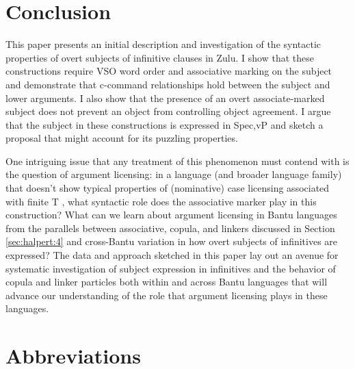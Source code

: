 \documentclass[output=paper,colorlinks,citecolor=brown]{langscibook}
\begin{document}
\section{Conclusion}\label{sec:halpert:5}

This paper presents an initial description and investigation of the syntactic properties of overt subjects of infinitive clauses in Zulu.  I show that these constructions require VSO word order and associative marking on the subject and demonstrate that c-command relationships hold between the subject and lower arguments. I also show that the presence of an overt associate-marked subject does not prevent an object from controlling object agreement.  I argue that the subject in these constructions is expressed in Spec,vP and sketch a proposal that might account for its puzzling properties. 

One intriguing issue that any treatment of this phenomenon must contend with is the question of argument licensing: in a language (and broader language family) that doesn't show typical properties of (nominative) case licensing associated with finite T \citep{Diercks2012,Halpert2015}, what syntactic role does the associative marker play in this construction? What can we learn about argument licensing in Bantu languages from the parallels between associative, copula, and linkers discussed in Section \ref{sec:halpert:4} and cross-Bantu variation in how overt subjects of infinitives are expressed? The data and approach sketched in this paper lay out an avenue for systematic investigation of subject expression in infinitives and the behavior of copula and linker particles both within and across Bantu languages that will advance our understanding of the role that argument licensing plays in these languages.


\section*{Abbreviations}
\end{document}
